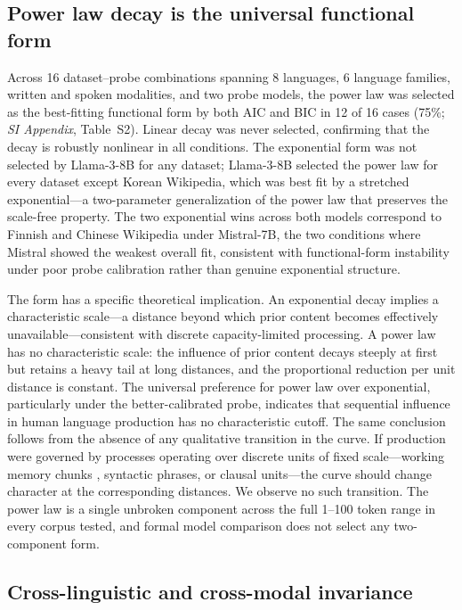 \documentclass[9pt,twocolumn,twoside]{pnas-new}
\begin{document}
\subsection*{Power law decay is the universal functional form}

Across 16 dataset--probe combinations spanning 8 languages, 6 language families, written and spoken modalities, and two probe models, the power law was selected as the best-fitting functional form by both AIC and BIC in 12 of 16 cases (75\%; \emph{SI Appendix}, Table~S2). Linear decay was never selected, confirming that the decay is robustly nonlinear in all conditions. The exponential form was not selected by Llama-3-8B for any dataset; Llama-3-8B selected the power law for every dataset except Korean Wikipedia, which was best fit by a stretched exponential---a two-parameter generalization of the power law that preserves the scale-free property. The two exponential wins across both models correspond to Finnish and Chinese Wikipedia under Mistral-7B, the two conditions where Mistral showed the weakest overall fit, consistent with functional-form instability under poor probe calibration rather than genuine exponential structure.

The form has a specific theoretical implication. An exponential decay implies a characteristic scale---a distance beyond which prior content becomes effectively unavailable---consistent with discrete capacity-limited processing. A power law has no characteristic scale: the influence of prior content decays steeply at first but retains a heavy tail at long distances, and the proportional reduction per unit distance is constant. The universal preference for power law over exponential, particularly under the better-calibrated probe, indicates that sequential influence in human language production has no characteristic cutoff. The same conclusion follows from the absence of any qualitative transition in the curve. If production were governed by processes operating over discrete units of fixed scale---working memory chunks \cite{cowan2001magical}, syntactic phrases, or clausal units---the curve should change character at the corresponding distances. We observe no such transition. The power law is a single unbroken component across the full 1--100 token range in every corpus tested, and formal model comparison does not select any two-component form.

\subsection*{Cross-linguistic and cross-modal invariance}
\end{document}

